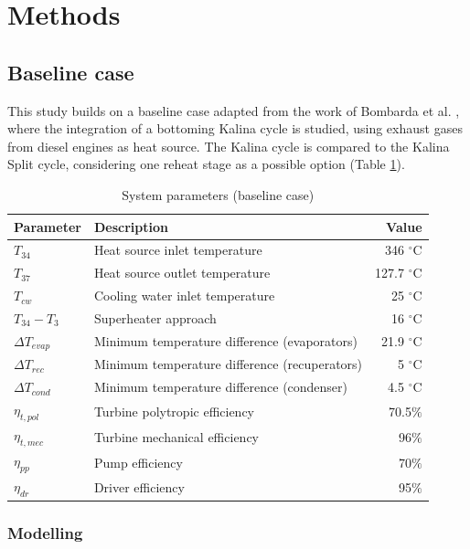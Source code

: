 \documentclass[final,times,3p]{elsarticle}
\begin{document}
\section{Methods}
\label{sec:methods}

\subsection{Baseline case}

This study builds on a baseline case adapted from the work of Bombarda et al. \cite{Bombarda2010b}, where the integration of a bottoming Kalina cycle is studied, using exhaust gases from diesel engines as heat source. The Kalina cycle is compared to the Kalina Split cycle, considering one reheat stage as a possible option (Table \ref{tab:system_baseline}).

\begin{table}[htbp]
\scriptsize
  \centering
  \caption{System parameters (baseline case)}
    \begin{tabular}{llr}
    \toprule
    Parameter & Description  & Value \\
    \midrule
     $T_{34}$ & Heat source inlet temperature & 346 $^{\circ}$C \\
     $T_{37}$     & Heat source outlet temperature & 127.7 $^{\circ}$C\\
     $T_{cw}$    & Cooling water inlet temperature & 25 $^{\circ}$C\\
     $T_{34}-T_{3}$  & Superheater approach & 16 $^{\circ}$C\\
     $\Delta T_{evap}$     & Minimum temperature difference (evaporators) & 21.9 $^{\circ}$C \\
     $\Delta T_{rec}$    & Minimum temperature difference (recuperators) & 5 $^{\circ}$C \\
     $\Delta T_{cond}$   & Minimum temperature difference (condenser) & 4.5 $^{\circ}$C \\
     $\eta_{t,pol}$    & Turbine polytropic efficiency & 70.5$\%$\\
     $\eta_{t,mec}$    & Turbine mechanical efficiency & 96$\%$\\
     $\eta_{pp}$    & Pump efficiency & 70$\%$\\
     $\eta_{dr}$  & Driver efficiency & 95$\%$\\
    \bottomrule
    \end{tabular}%
  \label{tab:system_baseline}%
\end{table}


		\subsubsection{Modelling}
\end{document}
